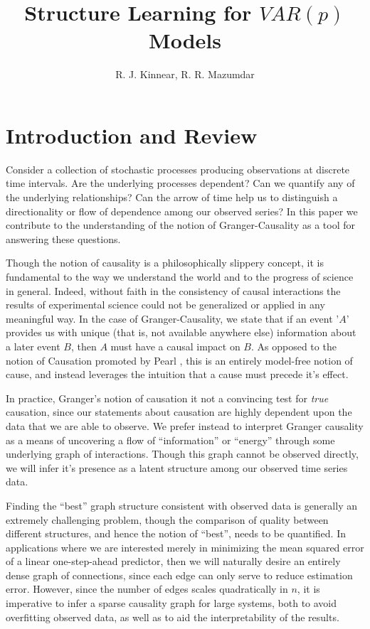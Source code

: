 \documentclass[12pt]{article}
\title{Structure Learning for $VAR(p)$ Models}
\author{R. J. Kinnear, R. R. Mazumdar}
\begin{document}
\maketitle
{}

\section{Introduction and Review}
\label{sec:introduction}
Consider a collection of stochastic processes producing observations
at discrete time intervals.  Are the underlying processes dependent?
Can we quantify any of the underlying relationships?  Can the arrow of
time help us to distinguish a directionality or flow of dependence
among our observed series?  In this paper we contribute to the
understanding of the notion of Granger-Causality
\cite{granger1969investigating} as a tool for answering these questions.

Though the notion of causality is a philosophically slippery concept,
it is fundamental to the way we understand the world and to the
progress of science in general.  Indeed, without faith in the
consistency of causal interactions the results of experimental science
could not be generalized or applied in any meaningful way.  In the
case of Granger-Causality, we state that if an event '$A$' provides us
with unique (that is, not available anywhere else) information about a
later event $B$, then $A$ must have a causal impact on $B$.  As
opposed to the notion of Causation promoted by Pearl
\cite{pearl2000art}, this is an entirely model-free notion of cause,
and instead leverages the intuition that a cause must precede it's
effect.

In practice, Granger's notion of causation it not a convincing test
for \textit{true} causation, since our statements about causation are
highly dependent upon the data that we are able to observe.  We prefer
instead to interpret Granger causality as a means of uncovering a flow
of ``information'' or ``energy'' through some underlying graph of
interactions.  Though this graph cannot be observed directly, we will
infer it's presence as a latent structure among our observed time
series data.

Finding the ``best'' graph structure consistent with observed data is
generally an extremely challenging problem, though the comparison of
quality between different structures, and hence the notion of
``best'', needs to be quantified.  In applications where we are
interested merely in minimizing the mean squared error of a linear
one-step-ahead predictor, then we will naturally desire an entirely
dense graph of connections, since each edge can only serve to reduce
estimation error.  However, since the number of edges scales
quadratically in $n$, it is imperative to infer a sparse causality
graph for large systems, both to avoid overfitting observed data, as
well as to aid the interpretability of the results.
\end{document}
